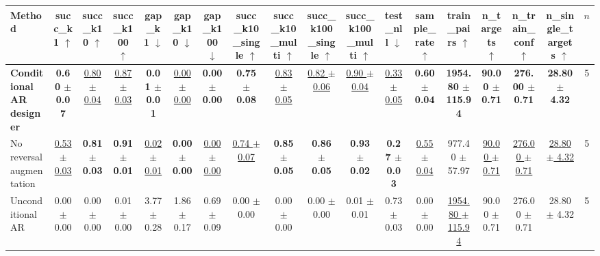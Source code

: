 \begin{tabular}{lccccccccccccccccc}
\toprule
Method & succ\_k1 $\uparrow$ & succ\_k10 $\uparrow$ & succ\_k100 $\uparrow$ & gap\_k1 $\downarrow$ & gap\_k10 $\downarrow$ & gap\_k100 $\downarrow$ & succ\_k10\_single $\uparrow$ & succ\_k10\_multi $\uparrow$ & succ\_k100\_single $\uparrow$ & succ\_k100\_multi $\uparrow$ & test\_nll $\downarrow$ & sample\_rate $\uparrow$ & train\_pairs $\uparrow$ & n\_targets $\uparrow$ & n\_train\_conf $\uparrow$ & n\_single\_targets $\uparrow$ & $n$ \\
\midrule
\textbf{Conditional AR designer} & \textbf{0.60 $\pm$ 0.07} & \underline{0.80 $\pm$ 0.04} & \underline{0.87 $\pm$ 0.03} & \textbf{0.01 $\pm$ 0.01} & \underline{0.00 $\pm$ 0.00} & \textbf{0.00 $\pm$ 0.00} & \textbf{0.75 $\pm$ 0.08} & \underline{0.83 $\pm$ 0.05} & \underline{0.82 $\pm$ 0.06} & \underline{0.90 $\pm$ 0.04} & \underline{0.33 $\pm$ 0.05} & \textbf{0.60 $\pm$ 0.04} & \textbf{1954.80 $\pm$ 115.94} & \textbf{90.00 $\pm$ 0.71} & \textbf{276.00 $\pm$ 0.71} & \textbf{28.80 $\pm$ 4.32} & 5 \\
No reversal augmentation & \underline{0.53 $\pm$ 0.03} & \textbf{0.81 $\pm$ 0.03} & \textbf{0.91 $\pm$ 0.01} & \underline{0.02 $\pm$ 0.01} & \textbf{0.00 $\pm$ 0.00} & \underline{0.00 $\pm$ 0.00} & \underline{0.74 $\pm$ 0.07} & \textbf{0.85 $\pm$ 0.05} & \textbf{0.86 $\pm$ 0.05} & \textbf{0.93 $\pm$ 0.02} & \textbf{0.27 $\pm$ 0.03} & \underline{0.55 $\pm$ 0.04} & 977.40 $\pm$ 57.97 & \underline{90.00 $\pm$ 0.71} & \underline{276.00 $\pm$ 0.71} & \underline{28.80 $\pm$ 4.32} & 5 \\
Unconditional AR & 0.00 $\pm$ 0.00 & 0.00 $\pm$ 0.00 & 0.01 $\pm$ 0.00 & 3.77 $\pm$ 0.28 & 1.86 $\pm$ 0.17 & 0.69 $\pm$ 0.09 & 0.00 $\pm$ 0.00 & 0.00 $\pm$ 0.00 & 0.00 $\pm$ 0.00 & 0.01 $\pm$ 0.01 & 0.73 $\pm$ 0.03 & 0.00 $\pm$ 0.00 & \underline{1954.80 $\pm$ 115.94} & 90.00 $\pm$ 0.71 & 276.00 $\pm$ 0.71 & 28.80 $\pm$ 4.32 & 5 \\
\bottomrule
\end{tabular}
